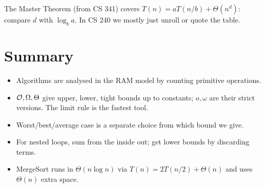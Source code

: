 \begin{aside}
The Master Theorem (from CS 341) covers $T(n) = aT(n/b) + \Theta(n^d)$:
compare $d$ with $\log_b a$. In CS 240 we mostly just unroll or quote the table.
\end{aside}

\section{Summary}
\begin{itemize}
  \item Algorithms are analysed in the RAM model by counting primitive operations.
  \item $\mathcal{O}, \Omega, \Theta$ give upper, lower, tight bounds up to constants;
        $o, \omega$ are their strict versions. The limit rule is the fastest tool.
  \item Worst/best/average case is a separate choice from which bound we give.
  \item For nested loops, sum from the inside out; get lower bounds by discarding terms.
  \item MergeSort runs in $\Theta(n \log n)$ via $T(n) = 2T(n/2) + \Theta(n)$
        and uses $\Theta(n)$ extra space.
\end{itemize}
